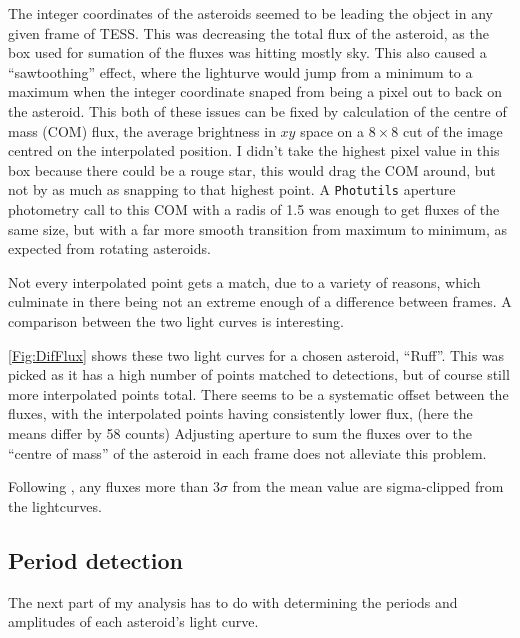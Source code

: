 \documentclass[12pt]{article}
\begin{document}
The integer coordinates of the asteroids seemed to be leading the object in any given frame of TESS. %
This was decreasing the total flux of the asteroid, as the box used for sumation of the fluxes was hitting mostly sky.
This also caused a ``sawtoothing'' effect, where the lighturve would jump from a minimum to a maximum when the integer coordinate snaped from being a pixel out to back on the asteroid.
This both of these issues can be fixed by calculation of the centre of mass (COM) flux, the average brightness in $xy$ space on a $8\times8$ cut of the image centred on the interpolated position.
I didn't take the highest pixel value in this box because there could be a rouge star, this would drag the COM around, but not by as much as snapping to that highest point.
A \texttt{Photutils} %
aperture photometry call to this COM with a radis of \qty{1.5}{\px} was enough to get fluxes of the same size, but with a far more smooth transition from maximum to minimum, as expected from rotating asteroids.

Not every interpolated point gets a match, due to a variety of reasons, which culminate in there being not an extreme enough of a difference between frames.
A comparison between the two light curves is interesting.

\autoref{Fig:DifFlux} shows these two light curves for a chosen asteroid, ``Ruff''.
This was picked as it has a high number of points matched to detections, but of course still more interpolated points total.
There seems to be a systematic offset between the fluxes, with the interpolated points having consistently lower flux, (here the means differ by 58 counts)
Adjusting aperture to sum the fluxes over to the ``centre of mass'' of the asteroid in each frame does not alleviate this problem.

Following \citet{McNeill2023}, any fluxes more than $3\sigma$ from the mean value are sigma-clipped from the lightcurves.



\subsection{Period detection}\label{SubSec:Periods}


The next part of my analysis has to do with determining the periods and amplitudes of each asteroid's light curve.
\end{document}
